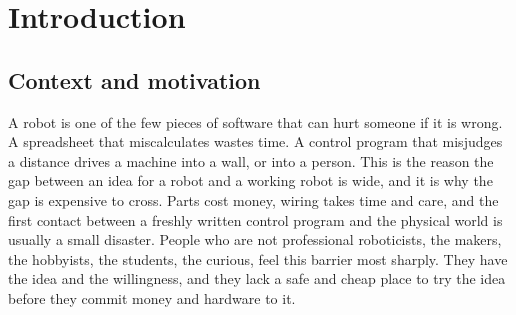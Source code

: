\documentclass[11pt,a4paper]{report}
\begin{document}
\setcounter{tocdepth}{1}
\makeatletter
\renewcommand*\l@chapter[2]{%
  \ifnum \c@tocdepth >\m@ne
    \addpenalty{-\@highpenalty}%
    \vskip 1\p@
    \setlength\@tempdima{1.5em}%
    \begingroup
      \parindent \z@ \rightskip \@pnumwidth
      \parfillskip -\@pnumwidth
      \leavevmode \bfseries
      \advance\leftskip\@tempdima
      \hskip -\leftskip
      #1\nobreak\hfil
      \nobreak\hb@xt@\@pnumwidth{\hss #2}\par
      \penalty\@highpenalty
    \endgroup
  \fi}
\makeatother
\clearpage
{\setlength{\parskip}{0pt}%
 \par\addvspace{12pt}{\large\bfseries\color{uolblue}\contentsname\par}\nopagebreak\vspace{1pt}%
 \makeatletter{}\makeatother}

\clearpage
{}
\setcounter{page}{1}

\chapter{Introduction}

\section{Context and motivation}
A robot is one of the few pieces of software that can hurt someone if it is wrong. A spreadsheet that miscalculates wastes time. A control program that misjudges a distance drives a machine into a wall, or into a person. This is the reason the gap between an idea for a robot and a working robot is wide, and it is why the gap is expensive to cross. Parts cost money, wiring takes time and care, and the first contact between a freshly written control program and the physical world is usually a small disaster. People who are not professional roboticists, the makers, the hobbyists, the students, the curious, feel this barrier most sharply. They have the idea and the willingness, and they lack a safe and cheap place to try the idea before they commit money and hardware to it.
\end{document}
